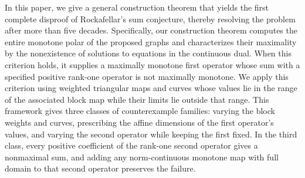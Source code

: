 \documentclass[11pt]{article}
\theoremstyle{definition}
\theoremstyle{remark}
\begin{document}




In this paper, we give a general construction theorem that yields the first complete disproof of Rockafellar's sum conjecture, thereby resolving the problem after more than five decades. 
Specifically, our construction theorem computes the entire monotone polar of the proposed graphs and characterizes their maximality by the nonexistence of solutions to equations in the continuous dual. When this criterion holds, it supplies a maximally monotone first operator whose sum with a specified positive rank-one operator is not maximally monotone. We apply this criterion using weighted triangular maps and curves whose values lie in the range of the associated block map while their limits lie outside that range.  This framework gives three classes of counterexample families: varying the block weights and curves, prescribing the affine dimensions of the first operator's values, and varying the second operator while keeping the first fixed. In the third class, every positive coefficient of the rank-one second operator gives a nonmaximal sum, and adding any norm-continuous monotone map with full domain to that second operator preserves the failure.
\end{document}
